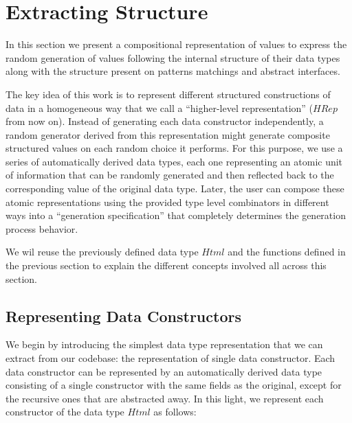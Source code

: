 \documentclass[conference, fleqn]{IEEEtran}
\newcommand{\Conid}[1]{\mathit{#1}}
\begin{document}
\section{Extracting Structure} \label{sec:hrep}

In this section we present a compositional representation of values to express
the random generation of values following the internal structure of their data
types along with the structure present on patterns matchings and abstract
interfaces.


The key idea of this work is to represent different structured constructions of
data in a homogeneous way that we call a ``higher-level representation'' (\ensuremath{\Conid{HRep}}
from now on).
%
Instead of generating each data constructor independently, a random generator
derived from this representation might generate composite structured values on
each random choice it performs.
%
%
For this purpose, we use a series of automatically derived data types, each one
representing an atomic unit of information that can be randomly generated and
then reflected back to the corresponding value of the original data type.
%
Later, the user can compose these atomic representations using the provided type
level combinators in different ways into a ``generation specification'' that
completely determines the generation process behavior.


We wil reuse the previously defined data type \ensuremath{\Conid{Html}} and the functions defined
in the previous section to explain the different concepts involved all across
this section.


\subsection*{\textbf{Representing Data Constructors}}

We begin by introducing the simplest data type representation that we can
extract from our codebase: the representation of single data constructor.
%
Each data constructor can be represented by an automatically derived data type
consisting of a single constructor with the same fields as the original, except
for the recursive ones that are abstracted away.
%
In this light, we represent each constructor of the data type \ensuremath{\Conid{Html}} as follows:
\end{document}
